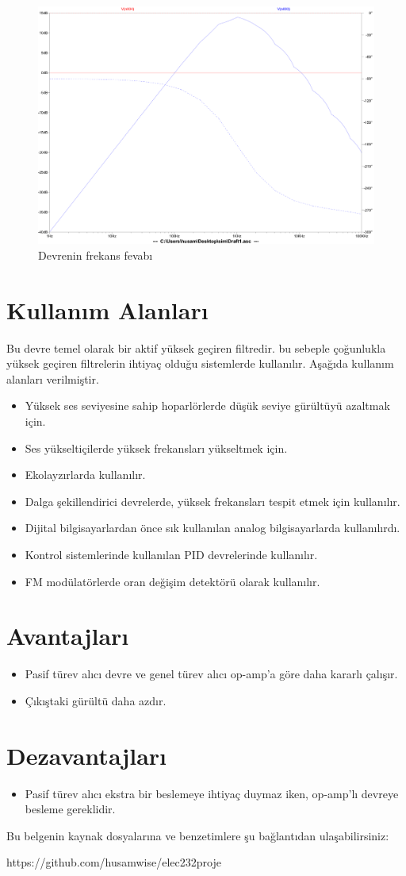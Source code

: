 \documentclass[]{scrartcl}
\begin{document}
\begin{figure}
	\shorthandoff{=}
	\includegraphics[width=\linewidth]{Draft2}
	\shorthandon{=}
	\caption{Devrenin frekans fevabı}
\end{figure}

\newpage
\section{Kullanım Alanları}
Bu devre temel olarak bir aktif yüksek geçiren filtredir. bu sebeple çoğunlukla yüksek geçiren filtrelerin ihtiyaç olduğu sistemlerde kullanılır. Aşağıda kullanım alanları verilmiştir.

\begin{itemize}  
\item Yüksek ses seviyesine sahip hoparlörlerde düşük seviye gürültüyü azaltmak için.
\item Ses yükseltiçilerde yüksek frekansları yükseltmek için. 
\item Ekolayzırlarda kullanılır.
\item Dalga şekillendirici devrelerde, yüksek frekansları tespit etmek için kullanılır.
\item Dijital bilgisayarlardan önce sık kullanılan analog bilgisayarlarda kullanılırdı.
\item Kontrol sistemlerinde kullanılan PID devrelerinde kullanılır.
\item FM modülatörlerde oran değişim detektörü olarak kullanılır. 
\end{itemize}

\section{Avantajları}
\begin{itemize}  
\item Pasif türev alıcı devre ve genel türev alıcı op-amp'a göre daha kararlı çalışır.
\item Çıkıştaki gürültü daha azdır.
\end{itemize}

\section{Dezavantajları}
\begin{itemize}  
	\item Pasif türev alıcı ekstra bir beslemeye ihtiyaç duymaz iken, op-amp'lı devreye besleme gereklidir.
\end{itemize}
\vspace*{\fill} Bu belgenin kaynak dosyalarına ve benzetimlere şu bağlantıdan ulaşabilirsiniz:

https://github.com/husamwise/elec232proje
\end{document}
